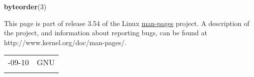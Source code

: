 \documentclass[]{article}
\let\realtextbf=\textbf
\renewcommand{\textbf}[1]{\textcolor{boldcolor}{\realtextbf{#1}}}
\renewcommand{\emph}[1]{\underline{#1}}
\begin{document}
\textbf{byteorder}(3)


This page is part of release 3.54 of the Linux \emph{man-pages} project.
A description of the project, and information about reporting bugs, can
be found at http://www.kernel.org/doc/man-pages/.

\begin{longtable}[c]{@{}ll@{}}
\toprule\addlinespace
2010-09-10 & GNU
\\\addlinespace
\bottomrule
\end{longtable}
\end{document}
